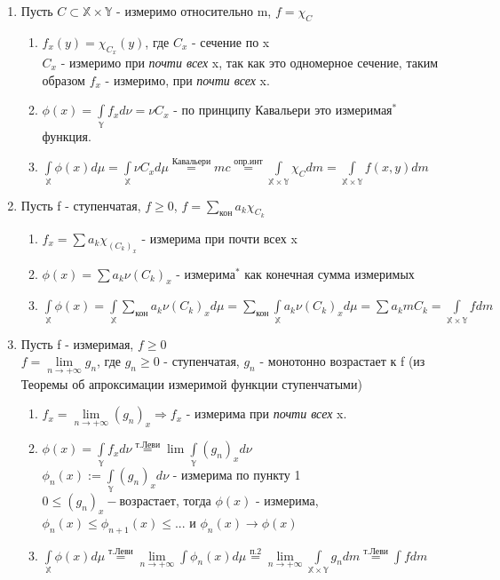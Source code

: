 \documentclass[paper=a4, fontsize=17pt]{article}
\begin{document}
\begin{enumerate}
	\item Пусть $C \subset \mathds{X} \times \mathds{Y}$ - измеримо относительно m, $f = \chi_C$
	\begin{enumerate}
		\item $f_x(y) = \chi_{C_x}(y)$, где $C_x$ - сечение по x \\
		$C_x$ - измеримо при \textit{почти всех} x, так как это одномерное сечение, таким образом $f_x$ - измеримо, при \textit{почти всех} x.
		\item $\phi(x) = \int\limits_{\mathds{Y}}f_xd\nu = \nu C_x$ - по принципу Кавальери это $\text{измеримая}^{\text{*}}$ функция.
		\item $\int\limits_{\mathds{X}}\phi(x)d\mu = \int\limits_{\mathds{X}}\nu C_x d \mu \overset{\text{Кавальери}}{=} mc \overset{\text{опр.инт}}{=} \int\limits_{\mathds{X} \times \mathds{Y}}\chi_C dm = \int\limits_{\mathds{X} \times \mathds{Y}}f(x, y) dm$
	\end{enumerate}
	\item Пусть f - ступенчатая, $f \geq 0$, $f = \sum\limits_{\text{кон}}a_k \chi_{C_k}$ \\
	\begin{enumerate}
		\item $f_x = \sum a_k \chi_{(C_k)_x}$ - измерима при почти всех x \\
		\item $\phi(x) = \sum a_k \nu(C_k)_x$ - $\text{измерима}^{\text{*}}$ как конечная сумма 	измеримых\\
		\item $\int\limits_{\mathds{X}}\phi(x) = \int\limits_{\mathds{X}}\sum\limits_{\text{кон}}a_k \nu (C_k)_x d \mu =
		\sum\limits_{\text{кон}}\int\limits_{\mathds{X}}a_k \nu (C_k)_x d \mu =
		\sum a_k m C_k = \int\limits_{\mathds{X} \times \mathds{Y}}f dm$
	\end{enumerate}
	\item Пусть f - измеримая, $f \geq 0$ \\
	$f = \lim\limits_{n \rightarrow +\infty}g_n$, где $g_n \geq 0$ - ступенчатая, $g_n$ - монотонно возрастает к f (из Теоремы об апроксимации измеримой функции ступенчатыми)
	\begin{enumerate}
		\item $f_x = \lim\limits_{n \rightarrow +\infty}(g_n)_x \Rightarrow f_x$ - измерима при \textit{почти всех} x.
		\item $\phi(x) = \int\limits_{\mathds{Y}}f_xd\nu \overset{\text{т.Леви}}{=} \lim \int\limits_{\mathds{Y}}(g_n)_xd\nu$ \\
		$\phi_n(x) := \int\limits_{\mathds{Y}}(g_n)_xd\nu$ - измерима по пункту 1 \\
		$0 \leq (g_n)_x - \text{возрастает}$, тогда $\phi(x)$ - измерима, $\phi_n(x) \leq \phi_{n+1}(x) \leq ...$ и $\phi_n(x) \rightarrow \phi(x)$
		\item $\int\limits_{\mathds{X}}\phi(x)d\mu \overset{\text{т.Леви}}{=} \lim\limits_{n \rightarrow +\infty}\int\phi_n(x)d\mu \overset{\text{п.2}}{=}\lim\limits_{n \rightarrow +\infty}\int\limits_{\mathds{X} \times \mathds{Y}}g_ndm \overset{\text{т.Леви}}{=} \int fdm$
	\end{enumerate}
\end{enumerate}
\end{document}

